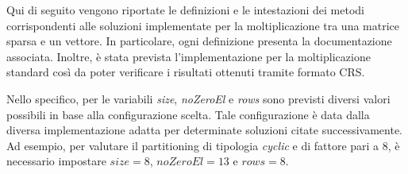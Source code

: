 Qui di seguito vengono riportate le definizioni e le intestazioni dei metodi corrispondenti alle soluzioni implementate per la moltiplicazione tra una matrice sparsa e un vettore. In particolare, ogni definizione presenta la documentazione associata. Inoltre, è stata prevista l'implementazione per la moltiplicazione standard così da poter verificare i risultati ottenuti tramite formato CRS.



Nello specifico, per le variabili \textit{size}, \textit{noZeroEl} e \textit{rows} sono previsti diversi valori possibili in base alla configurazione scelta. Tale configurazione è data dalla diversa implementazione adatta per determinate soluzioni citate successivamente. Ad esempio, per valutare il partitioning di tipologia \textit{cyclic} e di fattore pari a 8, è necessario impostare $size=8$, $noZeroEl=13$ e $rows=8$.